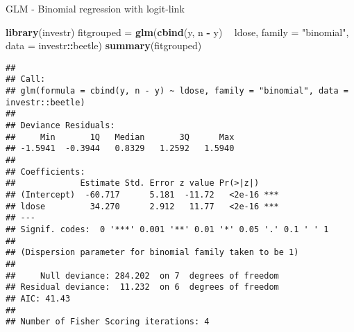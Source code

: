 \documentclass[ignorenonframetext,]{beamer}
\newenvironment{Shaded}{\begin{snugshade}}{\end{snugshade}}
\newcommand{\KeywordTok}[1]{\textcolor[rgb]{0.13,0.29,0.53}{\textbf{#1}}}
\newcommand{\DataTypeTok}[1]{\textcolor[rgb]{0.13,0.29,0.53}{#1}}
\newcommand{\StringTok}[1]{\textcolor[rgb]{0.31,0.60,0.02}{#1}}
\newcommand{\OperatorTok}[1]{\textcolor[rgb]{0.81,0.36,0.00}{\textbf{#1}}}
\newcommand{\NormalTok}[1]{#1}
\begin{document}
\begin{frame}[fragile]

\begin{block}{GLM - Binomial regression with logit-link}

\begin{Shaded}
\begin{Highlighting}[]
\KeywordTok{library}\NormalTok{(investr)}
\NormalTok{fitgrouped =}\StringTok{ }\KeywordTok{glm}\NormalTok{(}\KeywordTok{cbind}\NormalTok{(y, n }\OperatorTok{-}\StringTok{ }\NormalTok{y) }\OperatorTok{~}\StringTok{ }\NormalTok{ldose, }\DataTypeTok{family =} \StringTok{"binomial"}\NormalTok{, }\DataTypeTok{data =}\NormalTok{ investr}\OperatorTok{::}\NormalTok{beetle)}
\KeywordTok{summary}\NormalTok{(fitgrouped)}
\end{Highlighting}
\end{Shaded}

\begin{verbatim}
## 
## Call:
## glm(formula = cbind(y, n - y) ~ ldose, family = "binomial", data = investr::beetle)
## 
## Deviance Residuals: 
##     Min       1Q   Median       3Q      Max  
## -1.5941  -0.3944   0.8329   1.2592   1.5940  
## 
## Coefficients:
##             Estimate Std. Error z value Pr(>|z|)    
## (Intercept)  -60.717      5.181  -11.72   <2e-16 ***
## ldose         34.270      2.912   11.77   <2e-16 ***
## ---
## Signif. codes:  0 '***' 0.001 '**' 0.01 '*' 0.05 '.' 0.1 ' ' 1
## 
## (Dispersion parameter for binomial family taken to be 1)
## 
##     Null deviance: 284.202  on 7  degrees of freedom
## Residual deviance:  11.232  on 6  degrees of freedom
## AIC: 41.43
## 
## Number of Fisher Scoring iterations: 4
\end{verbatim}

\end{block}

\end{frame}
\end{document}
